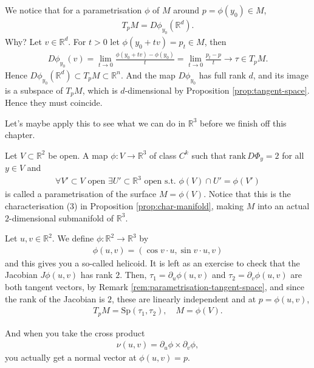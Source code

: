 \begin{remark}\label{rem:parametrisation-tangent-space}
	We notice that for a parametrisation $\phi$ of $M$ around $p = \phi(y_{0}) \in M$,
	\begin{align*}
		T_{p}M = D \phi_{y_{0}} ( \mathbb{R}^{d}).
	\end{align*}
	Why? Let $v \in \mathbb{R}^{d}$. For $t> 0$ let $\phi(y_{0} + tv) = p_{t} \in M$, then
	\begin{align*}
		D \phi_{y_{0}}(v) = \lim_{t \to 0} \frac{\phi(y_{0} + tv) - \phi(y_{0})}{t} = \lim_{t \to 0} \frac{p_{t} - p}{t} \to \tau \in T_{p}M.
	\end{align*}
	Hence $D \phi_{y_{0}}(\mathbb{R}^{d}) \subset T_{p}M \subset \mathbb{R}^{n}$. And the map $D \phi_{y_{0}}$ has full rank $d$, and its image is a subspace of $T_{p}M$, which is $d$-dimensional by Proposition \ref{prop:tangent-space}. Hence they must coincide.
\end{remark}

Let's maybe apply this to see what we can do in $\mathbb{R}^{3}$ before we finish off this chapter.

\begin{definition}\label{def:parametrised-surface}
    Let $V \subset \mathbb{R}^{2}$ be open. A map $\phi: V \to \mathbb{R}^{3}$ of class $C^{k}$ such that $\text{rank}\, D\Phi_{y} = 2$ for all $y \in V$ and 
    \begin{align*}
        \forall V' \subset V \text{ open } \exists U' \subset \mathbb{R}^{3} \text{ open s.t. } \phi(V) \cap U' = \phi(V')
    \end{align*}
    is called a parametrisation of the surface $M=\phi(V)$. Notice that this is the characterisation (3) in Proposition \ref{prop:char-manifold}, making $M$ into an actual $2$-dimensional submanifold of $\mathbb{R}^{3}$.
\end{definition}

\begin{eg} 
    Let $u, v \in \mathbb{R}^{2}$. We define $\phi: \mathbb{R}^{2} \to \mathbb{R}^{3}$ by
    \begin{align*}
        \phi(u, v) = (\cos v \cdot u, \sin v \cdot u, v)
    \end{align*}
    and this gives you a so-called helicoid. It is left as an exercise to check that the Jacobian $J \phi(u,v)$ has rank $2$. Then, $\tau_{1} = \partial_{u} \phi(u,v)$ and $\tau_{2} = \partial_{v} \phi(u,v)$ are both tangent vectors, by Remark \ref{rem:parametrisation-tangent-space}, and since the rank of the Jacobian is $2$, these are linearly independent and at $p = \phi(u,v)$,
    \begin{align*}
        T_{p}M = \text{Sp}(\tau_{1}, \tau_{2}), \quad  M = \phi(V).
    \end{align*}

    And when you take the cross product 
    \begin{align*}
        \nu(u,v) = \partial_{u} \phi \times \partial_{v} \phi,
    \end{align*}
    you actually get a normal vector at $\phi(u,v) = p$.
\end{eg}

